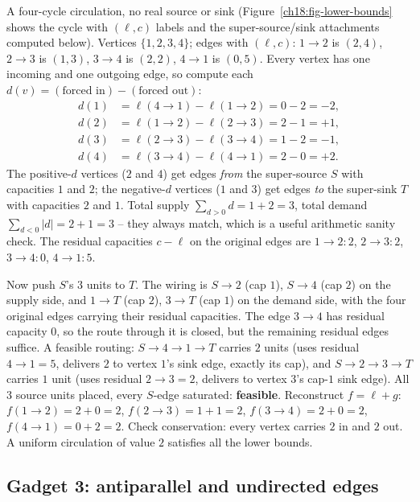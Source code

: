 \begin{labbox}
A four-cycle circulation, no real source or sink (Figure~\ref{ch18:fig-lower-bounds} shows the cycle with $(\ell,c)$ labels and the super-source/sink attachments computed below). Vertices $\{1,2,3,4\}$; edges with $(\ell,c)$: $1\to2$ is $(2,4)$, $2\to3$ is $(1,3)$, $3\to4$ is $(2,2)$, $4\to1$ is $(0,5)$. Every vertex has one incoming and one outgoing edge, so compute each $d(v)=(\text{forced in})-(\text{forced out})$:
\begin{align*}
  d(1) &= \ell(4\to1) - \ell(1\to2) = 0 - 2 = -2, \\
  d(2) &= \ell(1\to2) - \ell(2\to3) = 2 - 1 = +1, \\
  d(3) &= \ell(2\to3) - \ell(3\to4) = 1 - 2 = -1, \\
  d(4) &= \ell(3\to4) - \ell(4\to1) = 2 - 0 = +2.
\end{align*}
The positive-$d$ vertices ($2$ and $4$) get edges \emph{from} the super-source $S$ with capacities $1$ and $2$; the negative-$d$ vertices ($1$ and $3$) get edges \emph{to} the super-sink $T$ with capacities $2$ and $1$. Total supply $\sum_{d>0} d = 1+2 = 3$, total demand $\sum_{d<0}|d| = 2+1 = 3$ -- they always match, which is a useful arithmetic sanity check. The residual capacities $c-\ell$ on the original edges are $1\to2:2$, $2\to3:2$, $3\to4:0$, $4\to1:5$.
\par
Now push $S$'s $3$ units to $T$. The wiring is $S\to2$ (cap $1$), $S\to4$ (cap $2$) on the supply side, and $1\to T$ (cap $2$), $3\to T$ (cap $1$) on the demand side, with the four original edges carrying their residual capacities. The edge $3\to4$ has residual capacity $0$, so the route through it is closed, but the remaining residual edges suffice. A feasible routing: $S\to4\to1\to T$ carries $2$ units (uses residual $4\to1=5$, delivers $2$ to vertex $1$'s sink edge, exactly its cap), and $S\to2\to3\to T$ carries $1$ unit (uses residual $2\to3=2$, delivers to vertex $3$'s cap-$1$ sink edge). All $3$ source units placed, every $S$-edge saturated: \textbf{feasible}. Reconstruct $f=\ell+g$: $f(1{\to}2)=2+0=2$, $f(2{\to}3)=1+1=2$, $f(3{\to}4)=2+0=2$, $f(4{\to}1)=0+2=2$. Check conservation: every vertex carries $2$ in and $2$ out. A uniform circulation of value $2$ satisfies all the lower bounds.
\end{labbox}

\subsection{Gadget 3: antiparallel and undirected edges}
\label{ch18:antiparallel}

